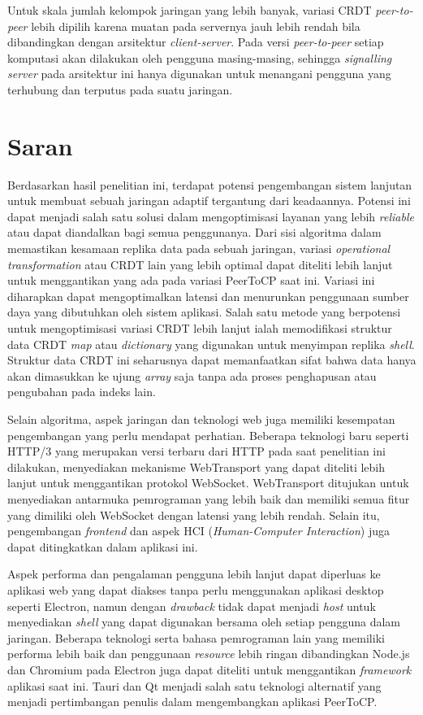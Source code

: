 Untuk skala jumlah kelompok jaringan yang lebih banyak, variasi CRDT \textit{peer-to-peer} lebih dipilih karena muatan pada servernya jauh lebih rendah bila dibandingkan dengan arsitektur \textit{client-server}. Pada versi \textit{peer-to-peer} setiap komputasi akan dilakukan oleh pengguna masing-masing, sehingga \textit{signalling server} pada arsitektur ini hanya digunakan untuk menangani pengguna yang terhubung dan terputus pada suatu jaringan.

\section{Saran}
\label{sec:saran}

Berdasarkan hasil penelitian ini, terdapat potensi pengembangan sistem lanjutan untuk membuat sebuah jaringan adaptif tergantung dari keadaannya. Potensi ini dapat menjadi salah satu solusi dalam mengoptimisasi layanan yang lebih \textit{reliable} atau dapat diandalkan bagi semua penggunanya. Dari sisi algoritma dalam memastikan kesamaan replika data pada sebuah jaringan, variasi \textit{operational transformation} atau CRDT lain yang lebih optimal dapat diteliti lebih lanjut untuk menggantikan yang ada pada variasi PeerToCP saat ini. Variasi ini diharapkan dapat mengoptimalkan latensi dan menurunkan penggunaan sumber daya yang dibutuhkan oleh sistem aplikasi. Salah satu metode yang berpotensi untuk mengoptimisasi variasi CRDT lebih lanjut ialah memodifikasi struktur data CRDT \textit{map} atau \textit{dictionary} yang digunakan untuk menyimpan replika \textit{shell}. Struktur data CRDT ini seharusnya dapat memanfaatkan sifat bahwa data hanya akan dimasukkan ke ujung \textit{array} saja tanpa ada proses penghapusan atau pengubahan pada indeks lain.

Selain algoritma, aspek jaringan dan teknologi web juga memiliki kesempatan pengembangan yang perlu mendapat perhatian. Beberapa teknologi baru seperti HTTP/3 yang merupakan versi terbaru dari HTTP pada saat penelitian ini dilakukan, menyediakan mekanisme WebTransport yang dapat diteliti lebih lanjut untuk menggantikan protokol WebSocket. WebTransport ditujukan untuk menyediakan antarmuka pemrograman yang lebih baik dan memiliki semua fitur yang dimiliki oleh WebSocket dengan latensi yang lebih rendah. Selain itu, pengembangan \textit{frontend} dan aspek HCI (\textit{Human-Computer Interaction}) juga dapat ditingkatkan dalam aplikasi ini.

Aspek performa dan pengalaman pengguna lebih lanjut dapat diperluas ke aplikasi web yang dapat diakses tanpa perlu menggunakan aplikasi desktop seperti Electron, namun dengan \textit{drawback} tidak dapat menjadi \textit{host} untuk menyediakan \textit{shell} yang dapat digunakan bersama oleh setiap pengguna dalam jaringan. Beberapa teknologi serta bahasa pemrograman lain yang memiliki performa lebih baik dan penggunaan \textit{resource} lebih ringan dibandingkan Node.js dan Chromium pada Electron juga dapat diteliti untuk menggantikan \textit{framework} aplikasi saat ini. Tauri dan Qt menjadi salah satu teknologi alternatif yang menjadi pertimbangan penulis dalam mengembangkan aplikasi PeerToCP.
